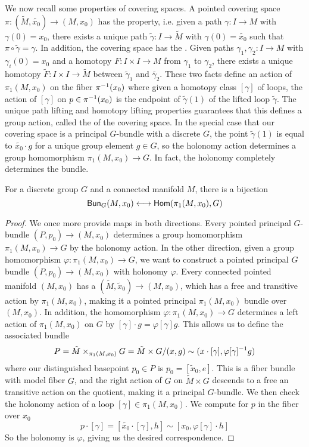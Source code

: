 %
We now recall some properties of covering spaces. A pointed covering space
$\pi : (\tilde{M}, \tilde{x_0}) \to (M, x_0)$ has the  property,
i.e. given a path $\gamma : I \to M$ with $\gamma(0) = x_0$, there exists a
unique path $\tilde{\gamma} : I \to \tilde{M}$ with $\gamma(0) = \tilde{x_0}$
such that $\pi \circ \tilde{\gamma} = \gamma$. In addition, the covering
space has the . Given paths
$\gamma_1, \gamma_2 : I \to M$ with $\gamma_i(0) = x_0$ and a homotopy
$F : I \times I \to M$ from $\gamma_1$ to $\gamma_2$, there exists a unique
homotopy $\tilde{F} : I \times I \to \tilde{M}$ between $\tilde{\gamma}_1$
and $\tilde{\gamma_2}$. These two facts define an action of $\pi_1(M, x_0)$
on the fiber $\pi^{-1}(x_0)$ where given a homotopy class $[\gamma]$ of
loops, the action of $[\gamma]$ on $p \in \pi^{-1}(x_0)$ is the endpoint
of $\tilde{\gamma}(1)$ of the lifted loop $\tilde{\gamma}$. The unique
path lifting and homotopy lifting properties guarantees that this defines
a group action, called the  of the covering space. In the
special case that our covering space is a principal $G$-bundle with a discrete $G$,
the point $\tilde{\gamma}(1)$ is equal to $\tilde{x_0} \cdot g$ for a unique
group element $g \in G$, so the holonomy action determines a group homomorphism
$\pi_1(M, x_0) \to G$. In fact, the holonomy completely determines the bundle.
%
\begin{thm}
For a discrete group $G$ and a connected manifold $M$, there is a bijection
\[
\mathsf{Bun}_G(M,x_0) \longleftrightarrow \mathsf{Hom}(\pi_1(M,x_0), G)
\]
\end{thm}
%
\begin{proof}
We once more provide maps in both directions. Every pointed principal $G$-bundle
$(P,p_0) \to (M, x_0)$ determines a group homomorphism $\pi_1(M,x_0) \to G$
by the holonomy action. In the other direction, given a group homomorphism
$\varphi : \pi_1(M, x_0) \to G$, we want to construct a pointed principal $G$
bundle $(P, p_0) \to (M, x_0)$ with holonomy $\varphi$. Every connected pointed manifold
$(M, x_0)$ has a  $(\tilde{M}, \tilde{x}_0) \to (M,x_0)$,
which has a free and transitive action by $\pi_1(M,x_0)$, making it a pointed
principal $\pi_1(M,x_0)$ bundle over $(M,x_0)$. In addition, the homomorphism
$\varphi : \pi_1(M, x_0) \to G$ determines a left action of $\pi_1(M,x_0)$
on $G$ by $[\gamma] \cdot g = \varphi[\gamma] g$. This allows us to define
the associated bundle
\[
P = \tilde{M} \times_{\pi_1(M, x_0)} G = \tilde{M} \times G
/ (x,g) \sim (x \cdot [\gamma], \varphi[\gamma]^{-1} g)
\]
where our distinguished basepoint $p_0 \in P$ is $p_0 = [\tilde{x}_0, e]$.
This is a fiber bundle with model fiber $G$, and the right action of $G$
on $\tilde{M} \times G$ descends to a free an transitive action on the quotient,
making it a principal $G$-bundle. We then check the holonomy action of a
loop $[\gamma] \in \pi_1(M, x_0)$. We compute for $p$ in the fiber over $x_0$
\[
p \cdot [\gamma] = [\tilde{x_0} \cdot [\gamma], h] \sim [x_0, \varphi[\gamma]\cdot h]
\]
So the holonomy is $\varphi$, giving us the desired correspondence.
\end{proof}

